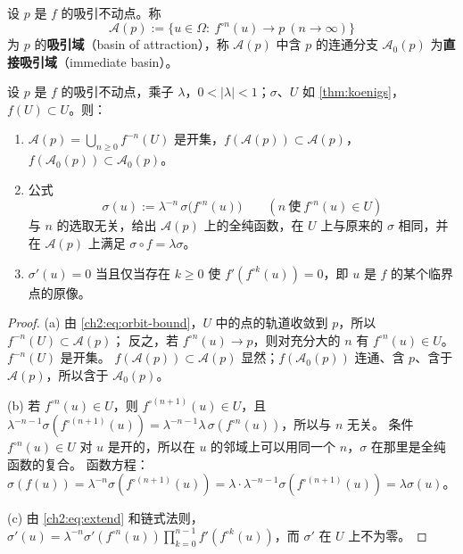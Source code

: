\begin{definition}\label{ch2:def:basin}
设 $p$ 是 $f$ 的吸引不动点。称
\[
  \mathcal A(p):=\{u\in\Omega:\ f^{\circ n}(u)\to p\ (n\to\infty)\}
\]
为 $p$ 的\textbf{吸引域}（basin of attraction），称 $\mathcal A(p)$ 中含 $p$ 的连通分支 $\mathcal A_0(p)$ 为\textbf{直接吸引域}（immediate basin）。
\end{definition}

\begin{proposition}\label{ch2:prop:extend}
设 $p$ 是 $f$ 的吸引不动点，乘子 $\lambda$，$0<|\lambda|<1$；$\sigma$、$U$ 如 \cref{thm:koenigs}，$f(U)\subset U$。则：
\begin{enumerate}[label=(\alph*)]
\item $\mathcal A(p)=\bigcup_{n\ge0}f^{-n}(U)$ 是开集，$f(\mathcal A(p))\subset\mathcal A(p)$，$f(\mathcal A_0(p))\subset\mathcal A_0(p)$。
\item 公式
  \begin{equation}\label{ch2:eq:extend}
    \sigma(u):=\lambda^{-n}\,\sigma\bigl(f^{\circ n}(u)\bigr)\qquad(n\ \text{使}\ f^{\circ n}(u)\in U)
  \end{equation}
  与 $n$ 的选取无关，给出 $\mathcal A(p)$ 上的全纯函数，在 $U$ 上与原来的 $\sigma$ 相同，并在 $\mathcal A(p)$ 上满足 $\sigma\circ f=\lambda\sigma$。
\item $\sigma'(u)=0$ 当且仅当存在 $k\ge0$ 使 $f'(f^{\circ k}(u))=0$，即 $u$ 是 $f$ 的某个临界点的原像。
\end{enumerate}
\end{proposition}

\begin{proof}
(a) 由 \eqref{ch2:eq:orbit-bound}，$U$ 中的点的轨道收敛到 $p$，所以 $f^{-n}(U)\subset\mathcal A(p)$；
反之，若 $f^{\circ n}(u)\to p$，则对充分大的 $n$ 有 $f^{\circ n}(u)\in U$。$f^{-n}(U)$ 是开集。
$f(\mathcal A(p))\subset\mathcal A(p)$ 显然；$f(\mathcal A_0(p))$ 连通、含 $p$、含于 $\mathcal A(p)$，所以含于 $\mathcal A_0(p)$。

(b) 若 $f^{\circ n}(u)\in U$，则 $f^{\circ(n+1)}(u)\in U$，且 $\lambda^{-n-1}\sigma(f^{\circ(n+1)}(u))=\lambda^{-n-1}\lambda\,\sigma(f^{\circ n}(u))$，所以与 $n$ 无关。
条件 $f^{\circ n}(u)\in U$ 对 $u$ 是开的，所以在 $u$ 的邻域上可以用同一个 $n$，$\sigma$ 在那里是全纯函数的复合。
函数方程：$\sigma(f(u))=\lambda^{-n}\sigma(f^{\circ(n+1)}(u))=\lambda\cdot\lambda^{-n-1}\sigma(f^{\circ(n+1)}(u))=\lambda\sigma(u)$。

(c) 由 \eqref{ch2:eq:extend} 和链式法则，$\sigma'(u)=\lambda^{-n}\sigma'(f^{\circ n}(u))\prod_{k=0}^{n-1}f'(f^{\circ k}(u))$，而 $\sigma'$ 在 $U$ 上不为零。
\end{proof}

